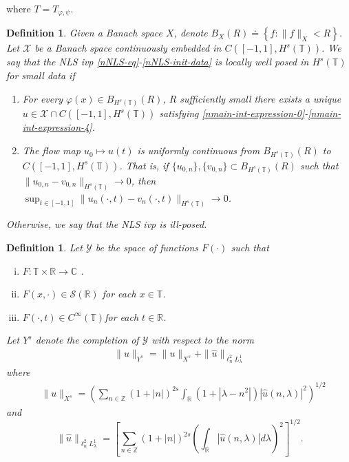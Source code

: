 \documentclass[12pt,reqno]{amsart}
\numberwithin{equation}{section}  %
\newcommand{\rr}{\mathbb{R}}
\newcommand{\zz}{\mathbb{Z}}
\newcommand{\cc}{\mathbb{C}}
\newcommand{\ci}{\mathbb{T}}
\newcommand{\wh}{\widehat}
\newcommand{\vp}{\varphi}
\newtheorem{definition}[theorem]{Definition}
\begin{document}
%
%
where $T = T_{\vp, \psi}$. 
\begin{definition}
  Given a Banach space $X$, denote $B_{X}(R) \doteq \left\{ f: \| f \|_{X} < R
  \right\}$. Let $\mathcal{X}$ be a Banach space continuously embedded in $C([-1,
      1], H^s(\ci))$. We say that the NLS ivp \eqref{nNLS-eq}-\eqref{nNLS-init-data} is
	\emph{locally well posed in
  $H^s(\ci)$ for small data} if 
	\begin{enumerate}
    \item For every $\vp(x) \in B_{H^{s}(\ci)}(R)$, $R$ sufficiently small
      there exists a unique \\ $u \in \mathcal{X} \cap C([-1,
      1], H^s(\ci))$ satisfying
      \eqref{nmain-int-expression-0}-\eqref{nmain-int-expression-4}.
    \item
      The flow map $u_0 \mapsto u(t)$ is uniformly continuous from
      $B_{H^{s}(\ci)}(R)$ 
      to $C(\left[ -1, 1 \right], H^s(\ci))$. That is, if
      $\{u_{0,n} \}, \{v_{0,n}\} \subset B_{H^{s}(\ci)}(R)$ such that $\|u_{0,n} -
      v_{0,n} \|_{H^{s}(\ci)} \to 0$, then \\
      $\sup_{t \in [-1, 1]}
      \|u_{n}(\cdot, t) - v_{n}(\cdot, t) \|_{H^s(\ci)} \to 0$.
  \end{enumerate}
	Otherwise, we say that the NLS ivp is \emph{ill-posed}.
\end{definition}
%
\begin{definition}
  Let $\mathcal{Y}$ be the space of functions $F(\cdot)$ such that
  \begin{enumerate}[(i)]
   \item{$F: \ci \times \rr \to \cc$ }.
   \item{ $F(x, \cdot) \in \mathcal{S}(\rr)$ for each $x \in \ci$}.
   \item{ $F(\cdot, t) \in C^{\infty}(\ci)$for each $t \in \rr$}.
  \end{enumerate}
  Let $Y^{s}$ denote the completion of $\mathcal{Y}$ with
  respect to the norm
  \begin{equation}
	\label{nY-s-norm}
	\begin{split}
		\|u\|_{Y^s} = \|u\|_{X^s} + \|\wh{u}\|_{ \ell^2_n L^1_\lambda }
	\end{split}
\end{equation}
    where
\begin{equation}
	\label{nX^s-norm}
	\begin{split}
		& \|u\|_{X^s}
		= \left ( \sum_{n\in \zz} \left (1 + |n| \right )^{2s} \int_\rr \left ( 1 + | 
		\lambda - n^{2} | \right ) | \wh{u} ( n, \lambda ) |^2
		\right )^{1/2}
	\end{split}
\end{equation}
and
%
%
\begin{equation}
	\label{nE-norm}
	\|\wh{u}\|_{ \ell^2_n L^1_\lambda } = \left[ \sum_{n \in \zz}(1 + | n |)^{2s} \left(
	\int_{\rr}| \wh{u}(n, \lambda) |d \lambda \right)^{2} \right]^{1/2}.
\end{equation}
  \end{definition}
\end{document}
